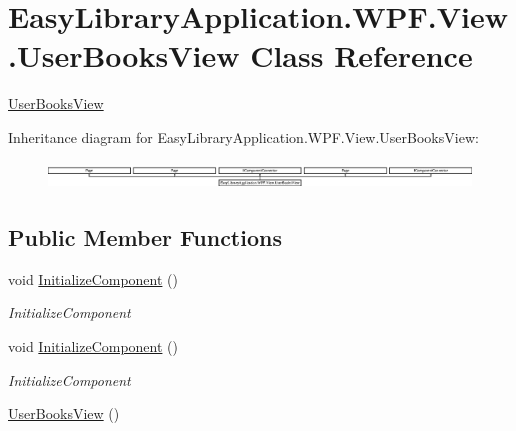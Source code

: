 \hypertarget{class_easy_library_application_1_1_w_p_f_1_1_view_1_1_user_books_view}{}\section{Easy\+Library\+Application.\+W\+P\+F.\+View.\+User\+Books\+View Class Reference}
\label{class_easy_library_application_1_1_w_p_f_1_1_view_1_1_user_books_view}


\mbox{\hyperlink{class_easy_library_application_1_1_w_p_f_1_1_view_1_1_user_books_view}{User\+Books\+View}}  


Inheritance diagram for Easy\+Library\+Application.\+W\+P\+F.\+View.\+User\+Books\+View\+:\begin{figure}[H]
\begin{center}
\leavevmode
\includegraphics[height=0.729642cm]{class_easy_library_application_1_1_w_p_f_1_1_view_1_1_user_books_view}
\end{center}
\end{figure}
\subsection*{Public Member Functions}
\begin{DoxyCompactItemize}
\item 
void \mbox{\hyperlink{class_easy_library_application_1_1_w_p_f_1_1_view_1_1_user_books_view_ae259878231726e06fa843e6c7f91c9c1}{Initialize\+Component}} ()
\begin{DoxyCompactList}\small\item\em Initialize\+Component \end{DoxyCompactList}\item 
void \mbox{\hyperlink{class_easy_library_application_1_1_w_p_f_1_1_view_1_1_user_books_view_ae259878231726e06fa843e6c7f91c9c1}{Initialize\+Component}} ()
\begin{DoxyCompactList}\small\item\em Initialize\+Component \end{DoxyCompactList}\item 
\mbox{\hyperlink{class_easy_library_application_1_1_w_p_f_1_1_view_1_1_user_books_view_abbf9557097b6c4f131b60f40318bf4f2}{User\+Books\+View}} ()
\end{DoxyCompactItemize}



